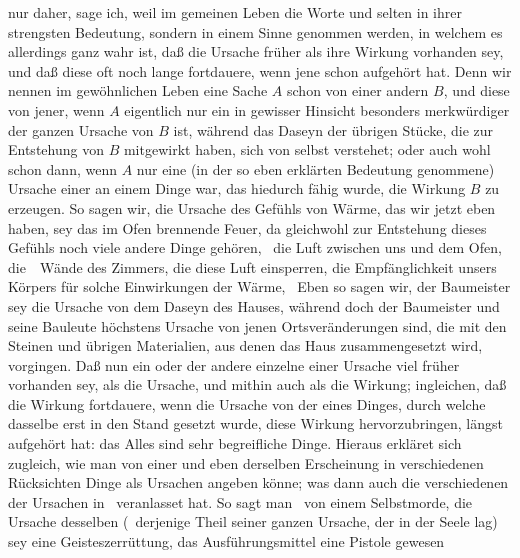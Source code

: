 \begin{aufza}
\begin{aufzb}
nur daher, sage ich, weil im gemeinen Leben die Worte  und  selten in ihrer strengsten Bedeutung, sondern in einem Sinne genommen werden, in welchem es allerdings ganz wahr ist, daß die Ursache früher als ihre Wirkung vorhanden sey, und daß diese oft noch lange fortdauere, wenn jene schon aufgehört hat. Denn wir nennen im gewöhnlichen Leben eine Sache $A$ schon  von einer andern $B$, und diese  von jener, wenn $A$ eigentlich nur ein in gewisser Hinsicht besonders merkwürdiger  der ganzen Ursache von $B$ ist, während das Daseyn der übrigen Stücke, die zur Entstehung von $B$ mitgewirkt haben, sich von selbst verstehet; oder auch wohl schon dann, wenn $A$ nur eine (in der so eben erklärten Bedeutung genommene) Ursache einer  an einem Dinge war, das hiedurch fähig wurde, die Wirkung $B$ zu erzeugen. So sagen wir, die Ursache des Gefühls von Wärme, das wir jetzt eben haben, sey das im Ofen brennende Feuer, da gleichwohl zur Entstehung dieses Gefühls noch viele andere Dinge gehören, \zB\ die Luft zwischen uns und dem Ofen, die~\ Wände des Zimmers, die diese Luft einsperren, die Empfänglichkeit unsers Körpers für solche Einwirkungen der Wärme, \usw\ Eben so sagen wir, der Baumeister sey die Ursache von dem Daseyn des Hauses, während doch der Baumeister und seine Bauleute höchstens Ursache von jenen Ortsveränderungen sind, die mit den Steinen und übrigen Materialien, aus denen das Haus zusammengesetzt wird, vorgingen. Daß nun ein oder der andere einzelne  einer Ursache viel früher vorhanden sey, als die  Ursache, und mithin auch als die Wirkung; ingleichen, daß die Wirkung fortdauere, wenn die Ursache von der  eines Dinges, durch welche dasselbe erst in den Stand gesetzt wurde, diese Wirkung hervorzubringen, längst aufgehört hat: das Alles sind sehr begreifliche Dinge. Hieraus erkläret sich zugleich, wie man von einer und eben derselben Erscheinung in verschiedenen Rücksichten  Dinge als Ursachen angeben könne; was dann auch die verschiedenen  der Ursachen in  \udgl\ veranlasset hat. So sagt man \zB\ von einem Selbstmorde, die  Ursache desselben (\dh\ derjenige Theil seiner ganzen Ursache, der in der Seele lag) sey eine Geisteszerrüttung, das  Ausführungsmittel eine Pistole gewesen \udgl\

\end{aufzb}
\end{aufza}
